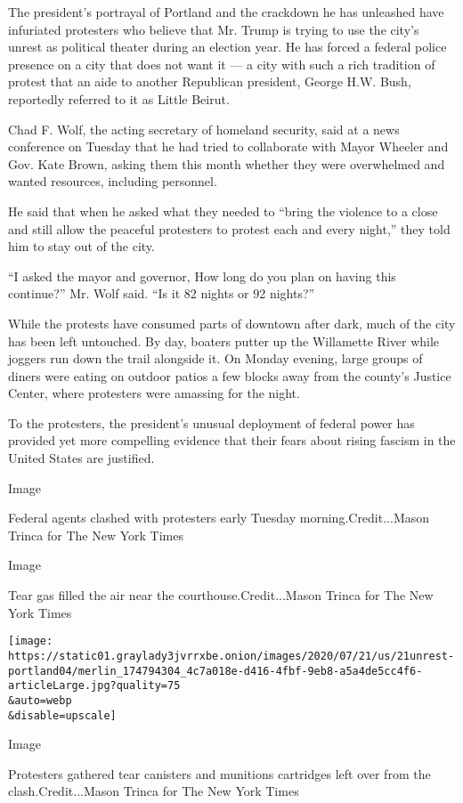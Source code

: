 The president's portrayal of Portland and the crackdown he has unleashed
have infuriated protesters who believe that Mr. Trump is trying to use
the city's unrest as political theater during an election year. He has
forced a federal police presence on a city that does not want it --- a
city with such a rich tradition of protest that an aide to another
Republican president, George H.W. Bush, reportedly referred to it as
Little Beirut.

Chad F. Wolf, the acting secretary of homeland security, said at a news
conference on Tuesday that he had tried to collaborate with Mayor
Wheeler and Gov. Kate Brown, asking them this month whether they were
overwhelmed and wanted resources, including personnel.

He said that when he asked what they needed to ``bring the violence to a
close and still allow the peaceful protesters to protest each and every
night,'' they told him to stay out of the city.

``I asked the mayor and governor, How long do you plan on having this
continue?'' Mr. Wolf said. ``Is it 82 nights or 92 nights?''

While the protests have consumed parts of downtown after dark, much of
the city has been left untouched. By day, boaters putter up the
Willamette River while joggers run down the trail alongside it. On
Monday evening, large groups of diners were eating on outdoor patios a
few blocks away from the county's Justice Center, where protesters were
amassing for the night.

To the protesters, the president's unusual deployment of federal power
has provided yet more compelling evidence that their fears about rising
fascism in the United States are justified.

Image

Federal agents clashed with protesters early Tuesday
morning.Credit...Mason Trinca for The New York Times

Image

Tear gas filled the air near the courthouse.Credit...Mason Trinca for
The New York Times

\texttt{[image: https://static01.graylady3jvrrxbe.onion/images/2020/07/21/us/21unrest-portland04/merlin\_174794304\_4c7a018e-d416-4fbf-9eb8-a5a4de5cc4f6-articleLarge.jpg?quality=75\\\&auto=webp\\\&disable=upscale]}

Image

Protesters gathered tear canisters and munitions cartridges left over
from the clash.Credit...Mason Trinca for The New York Times


